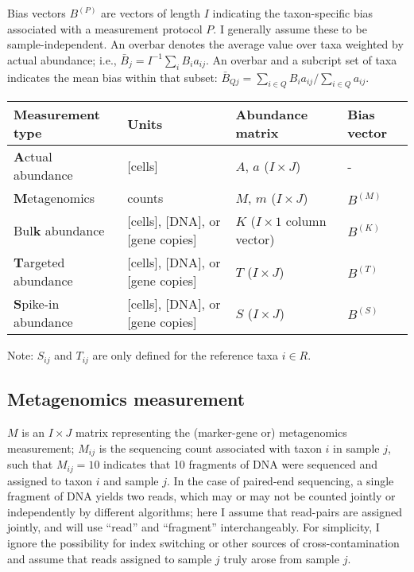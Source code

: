 \documentclass[
]{article}
\theoremstyle{definition}
\theoremstyle{definition}
\theoremstyle{definition}
\theoremstyle{definition}
\theoremstyle{remark}
\begin{document}
Bias vectors \(B^{(P)}\) are vectors of length \(I\) indicating the taxon-specific bias associated with a measurement protocol \(P\).
I generally assume these to be sample-independent.
An overbar denotes the average value over taxa weighted by actual abundance; i.e., \(\bar B_j = I^{-1} \sum_i B_i a_{ij}\).
An overbar and a subcript set of taxa indicates the mean bias within that subset: \(\bar B_{Qj} = \sum_{i\in Q} B_i a_{ij} / \sum_{i\in Q} a_{ij}\).

\begin{longtable}[]{@{}llll@{}}
\toprule
Measurement type & Units & Abundance matrix & Bias vector \\
\midrule
\endhead
\textbf{A}ctual abundance & {[}cells{]} & \(A\), \(a\) (\(I\times J\)) & - \\
\textbf{M}etagenomics & counts & \(M\), \(m\) (\(I\times J\)) & \(B^{(M)}\) \\
Bul\textbf{k} abundance & {[}cells{]}, {[}DNA{]}, or {[}gene copies{]} & \(K\) (\(I\times 1\) column vector) & \(B^{(K)}\) \\
\textbf{T}argeted abundance & {[}cells{]}, {[}DNA{]}, or {[}gene copies{]} & \(T\) (\(I \times J\)) & \(B^{(T)}\) \\
\textbf{S}pike-in abundance & {[}cells{]}, {[}DNA{]}, or {[}gene copies{]} & \(S\) (\(I \times J\)) & \(B^{(S)}\) \\
\bottomrule
\end{longtable}

Note: \(S_{ij}\) and \(T_{ij}\) are only defined for the reference taxa \(i \in R\).

\hypertarget{metagenomics-measurement}{%
\subsection{Metagenomics measurement}\label{metagenomics-measurement}}

\(M\) is an \(I\times J\) matrix representing the (marker-gene or) metagenomics measurement; \(M_{ij}\) is the sequencing count associated with taxon \(i\) in sample \(j\), such that \(M_{ij} = 10\) indicates that 10 fragments of DNA were sequenced and assigned to taxon \(i\) and sample \(j\).
In the case of paired-end sequencing, a single fragment of DNA yields two reads, which may or may not be counted jointly or independently by different algorithms; here I assume that read-pairs are assigned jointly, and will use ``read'' and ``fragment'' interchangeably.
For simplicity, I ignore the possibility for index switching or other sources of cross-contamination and assume that reads assigned to sample \(j\) truly arose from sample \(j\).
\end{document}
